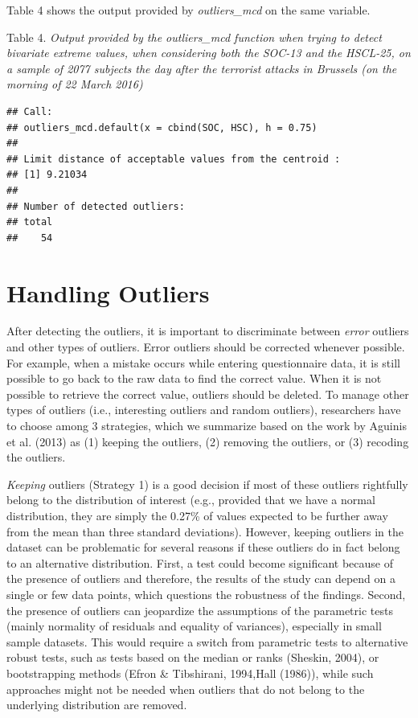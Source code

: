\documentclass[man,floatsintext]{apa6}
\begin{document}
Table 4 shows the output provided by \emph{outliers\_mcd} on the same
variable.

Table 4. \emph{Output provided by the outliers\_mcd function when trying
to detect bivariate extreme values, when considering both the SOC-13 and
the HSCL-25, on a sample of 2077 subjects the day after the terrorist
attacks in Brussels (on the morning of 22 March 2016)}

\begin{verbatim}
## Call:
## outliers_mcd.default(x = cbind(SOC, HSC), h = 0.75)
## 
## Limit distance of acceptable values from the centroid :
## [1] 9.21034
## 
## Number of detected outliers:
## total 
##    54
\end{verbatim}

\section{Handling Outliers}\label{handling-outliers}

After detecting the outliers, it is important to discriminate between
\emph{error} outliers and other types of outliers. Error outliers should
be corrected whenever possible. For example, when a mistake occurs while
entering questionnaire data, it is still possible to go back to the raw
data to find the correct value. When it is not possible to retrieve the
correct value, outliers should be deleted. To manage other types of
outliers (i.e., interesting outliers and random outliers), researchers
have to choose among 3 strategies, which we summarize based on the work
by Aguinis et al. (2013) as (1) keeping the outliers, (2) removing the
outliers, or (3) recoding the outliers.

\emph{Keeping} outliers (Strategy 1) is a good decision if most of these
outliers rightfully belong to the distribution of interest (e.g.,
provided that we have a normal distribution, they are simply the 0.27\%
of values expected to be further away from the mean than three standard
deviations). However, keeping outliers in the dataset can be problematic
for several reasons if these outliers do in fact belong to an
alternative distribution. First, a test could become significant because
of the presence of outliers and therefore, the results of the study can
depend on a single or few data points, which questions the robustness of
the findings. Second, the presence of outliers can jeopardize the
assumptions of the parametric tests (mainly normality of residuals and
equality of variances), especially in small sample datasets. This would
require a switch from parametric tests to alternative robust tests, such
as tests based on the median or ranks (Sheskin, 2004), or bootstrapping
methods (Efron \& Tibshirani, 1994,Hall (1986)), while such approaches
might not be needed when outliers that do not belong to the underlying
distribution are removed.
\end{document}
